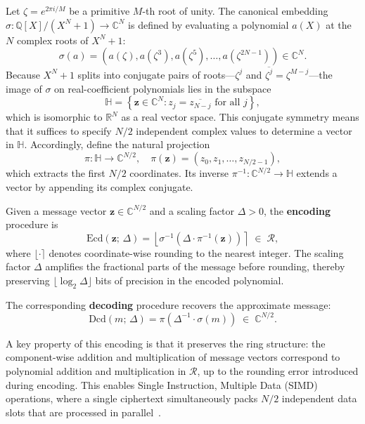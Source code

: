 Let $\zeta = e^{2\pi i / M}$ be a primitive $M$-th root of unity. The canonical embedding $\sigma: \mathbb{Q}[X]/(X^N+1) \to \mathbb{C}^N$ is defined by evaluating a polynomial $a(X)$ at the $N$ complex roots of $X^N + 1$:
\begin{equation}
    \sigma(a) = \left(a(\zeta), a(\zeta^3), a(\zeta^5), \ldots, a(\zeta^{2N-1})\right) \in \mathbb{C}^N.
\end{equation}
Because $X^N + 1$ splits into conjugate pairs of roots---$\zeta^j$ and $\overline{\zeta^j} = \zeta^{M-j}$---the image of $\sigma$ on real-coefficient polynomials lies in the subspace
\begin{equation}
    \mathbb{H} = \left\{ \mathbf{z} \in \mathbb{C}^N : z_j = \overline{z_{N-j}} \text{ for all } j \right\},
\end{equation}
which is isomorphic to $\mathbb{R}^N$ as a real vector space. This conjugate symmetry means that it suffices to specify $N/2$ independent complex values to determine a vector in $\mathbb{H}$. Accordingly, define the natural projection
\begin{equation}
    \pi: \mathbb{H} \to \mathbb{C}^{N/2}, \quad \pi(\mathbf{z}) = (z_0, z_1, \ldots, z_{N/2-1}),
\end{equation}
which extracts the first $N/2$ coordinates. Its inverse $\pi^{-1}: \mathbb{C}^{N/2} \to \mathbb{H}$ extends a vector by appending its complex conjugate.

Given a message vector $\mathbf{z} \in \mathbb{C}^{N/2}$ and a scaling factor $\Delta > 0$, the \textbf{encoding} procedure is
\begin{equation}
    \mathrm{Ecd}(\mathbf{z};\, \Delta) = \left\lfloor \sigma^{-1}\!\left(\Delta \cdot \pi^{-1}(\mathbf{z})\right) \right\rceil \;\in\; \mathcal{R},
    \label{eq:ckks_encode}
\end{equation}
where $\lfloor \cdot \rceil$ denotes coordinate-wise rounding to the nearest integer. The scaling factor $\Delta$ amplifies the fractional parts of the message before rounding, thereby preserving $\lfloor \log_2 \Delta \rfloor$ bits of precision in the encoded polynomial.

The corresponding \textbf{decoding} procedure recovers the approximate message:
\begin{equation}
    \mathrm{Dcd}(m;\, \Delta) = \pi\!\left(\Delta^{-1} \cdot \sigma(m)\right) \;\in\; \mathbb{C}^{N/2}.
    \label{eq:ckks_decode}
\end{equation}

A key property of this encoding is that it preserves the ring structure: the component-wise addition and multiplication of message vectors correspond to polynomial addition and multiplication in $\mathcal{R}$, up to the rounding error introduced during encoding. This enables Single Instruction, Multiple Data (SIMD) operations, where a single ciphertext simultaneously packs $N/2$ independent data slots that are processed in parallel~\cite{smart2014fully}.

